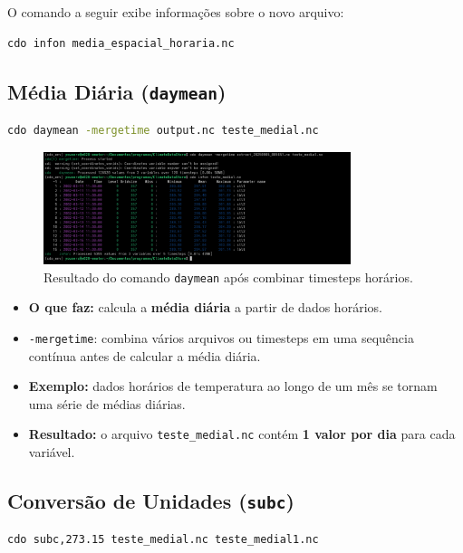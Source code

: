 \documentclass[12pt, a4paper]{article}
\begin{document}
O comando a seguir exibe informações sobre o novo arquivo:

\begin{lstlisting}[language=bash]
cdo infon media_espacial_horaria.nc
\end{lstlisting}

\subsection{Média Diária (\texttt{daymean})}

\begin{lstlisting}[language=bash]
cdo daymean -mergetime output.nc teste_medial.nc
\end{lstlisting}

\begin{figure}[h!]
    \centering
    \includegraphics[width=0.8\textwidth]{2.png}
    \caption{Resultado do comando \texttt{daymean} após combinar timesteps horários.}
    \label{fig:daymean}
\end{figure}

\begin{itemize}
    \item \textbf{O que faz:} calcula a \textbf{média diária} a partir de dados horários.
    \item \texttt{-mergetime}: combina vários arquivos ou timesteps em uma sequência contínua antes de calcular a média diária.
    \item \textbf{Exemplo:} dados horários de temperatura ao longo de um mês se tornam uma série de médias diárias.
    \item \textbf{Resultado:} o arquivo \texttt{teste\_medial.nc} contém \textbf{1 valor por dia} para cada variável.
\end{itemize}

\subsection{Conversão de Unidades (\texttt{subc})}

\begin{lstlisting}[language=bash]
cdo subc,273.15 teste_medial.nc teste_medial1.nc
\end{lstlisting}
\end{document}
